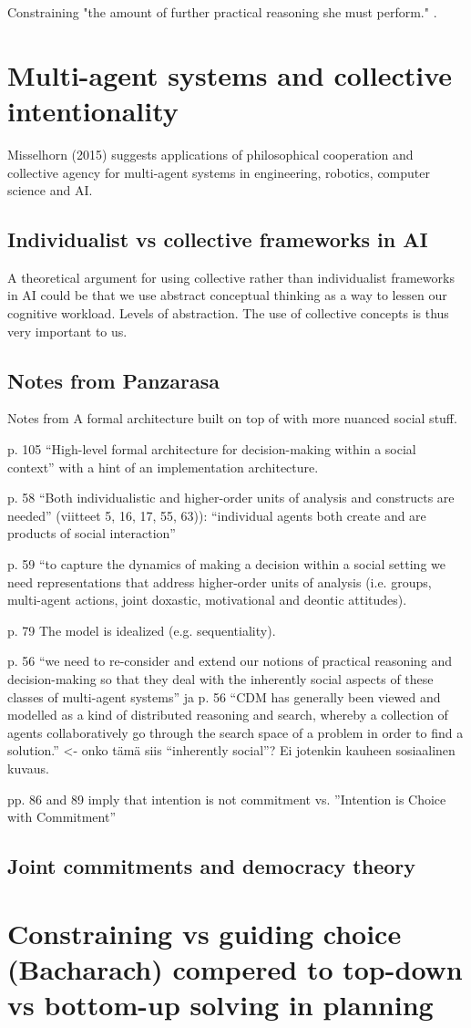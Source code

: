Constraining "the amount of further practical reasoning she must perform." \citep*{bratman_plans_1988}.


\section{Multi-agent systems and collective intentionality}
Misselhorn (2015) suggests applications of philosophical cooperation and collective agency for multi-agent systems in engineering, robotics, computer science and AI.

\subsection{Individualist vs collective frameworks in AI}

A theoretical argument for using collective rather than individualist frameworks in AI could be that we use abstract conceptual thinking as a way to lessen our cognitive workload. Levels of abstraction. The use of collective concepts is thus very important to us.




\subsection{Notes from Panzarasa}
Notes from \citeauthor{panzarasa_formalizing_2002}
A formal architecture built on top of \citet{wooldridge_intelligent_1995} with more nuanced social stuff.

p. 105 “High-level formal architecture for decision-making within a social context” with a hint of an implementation architecture.

p. 58 “Both individualistic and higher-order units of analysis and constructs are needed” (viitteet 5, 16, 17, 55, 63)): “individual agents both create and are products of social interaction”

p. 59 “to capture the dynamics of making a decision within a social setting we need representations that address higher-order units of analysis (i.e. groups, multi-agent actions, joint doxastic, motivational and deontic attitudes).

p. 79 The model is idealized (e.g. sequentiality).

p. 56 “we need to re-consider and extend our notions of practical reasoning and decision-making so that they deal with the inherently social aspects of these classes of multi-agent systems” ja p. 56 “CDM has generally been viewed and modelled as a kind of distributed reasoning and search, whereby a collection of agents collaboratively go through the search space of a problem in order to find a solution.” <- onko tämä siis “inherently social”? Ei jotenkin kauheen sosiaalinen kuvaus.

pp. 86 and 89 imply that intention is not commitment vs. \citealt{cohen_intention_1990} ”Intention is Choice with Commitment”


\subsection{Joint commitments and democracy theory}

\section{Constraining vs guiding choice (Bacharach) compered to top-down vs bottom-up solving in planning}
